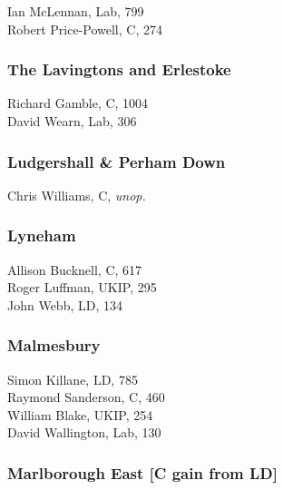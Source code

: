 \documentclass[a4paper,openany,10pt]{book}
\begin{document}
Ian McLennan, Lab, 799\\
Robert Price-Powell, C, 274\\


\subsubsection*{The Lavingtons and Erlestoke}



Richard Gamble, C, 1004\\
David Wearn, Lab, 306\\


\subsubsection*{Ludgershall \& Perham Down}



Chris Williams, C, \emph{unop.}\\


\subsubsection*{Lyneham}



Allison Bucknell, C, 617\\
Roger Luffman, UKIP, 295\\
John Webb, LD, 134\\


\subsubsection*{Malmesbury}



Simon Killane, LD, 785\\
Raymond Sanderson, C, 460\\
William Blake, UKIP, 254\\
David Wallington, Lab, 130\\


\subsubsection*{Marlborough East \hspace*{\fill}\nolinebreak[1]%
\enspace\hspace*{\fill}
[C gain from LD]}
\end{document}
